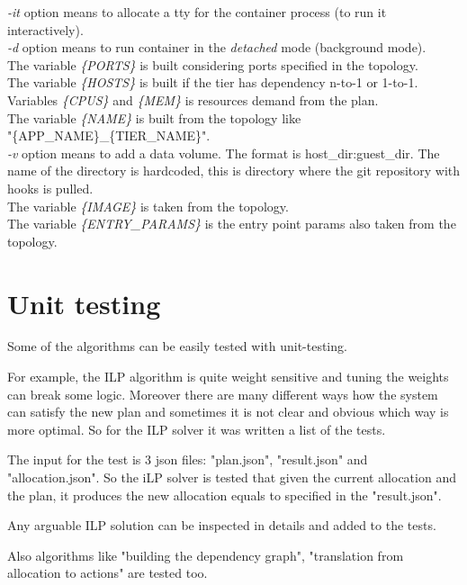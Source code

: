 \textit{-it} option means to allocate a tty for the container process (to run it interactively).\\
\textit{-d} option means to run container in the \textit{detached} mode (background mode).\\
The variable \textit{\{PORTS\}} is built considering ports specified in the topology.\\
The variable \textit{\{HOSTS\}} is built if the tier has dependency n-to-1 or 1-to-1.\\
Variables \textit{\{CPUS\}} and \textit{\{MEM\}} is resources demand from the plan.\\
The variable \textit{\{NAME\}} is built from the topology like\\ "\{APP\_NAME\}\_\{TIER\_NAME\}".\\
\textit{-v} option means to add a data volume. The format is host\_dir:guest\_dir. The name of the directory is hardcoded, this is directory where the git repository with hooks is pulled.\\
The variable \textit{\{IMAGE\}} is taken from the topology.\\
The variable \textit{\{ENTRY\_PARAMS\}} is the entry point params also taken from the topology.


\section{Unit testing}
Some of the algorithms can be easily tested with unit-testing.

For example, the ILP algorithm is quite weight sensitive and tuning the weights can break some logic. Moreover there are many different ways how the system can satisfy the new plan and sometimes it is not clear and obvious which way is more optimal. So for the ILP solver it was written a list of the tests.

The input for the test is 3 json files: "plan.json", "result.json" and "allocation.json". So the iLP solver is tested that given the current allocation and the plan, it produces the new allocation equals to specified in the "result.json".

Any arguable ILP solution can be inspected in details and added to the tests.

Also algorithms like "building the dependency graph", "translation from allocation to actions" are tested too.

\clearpage
